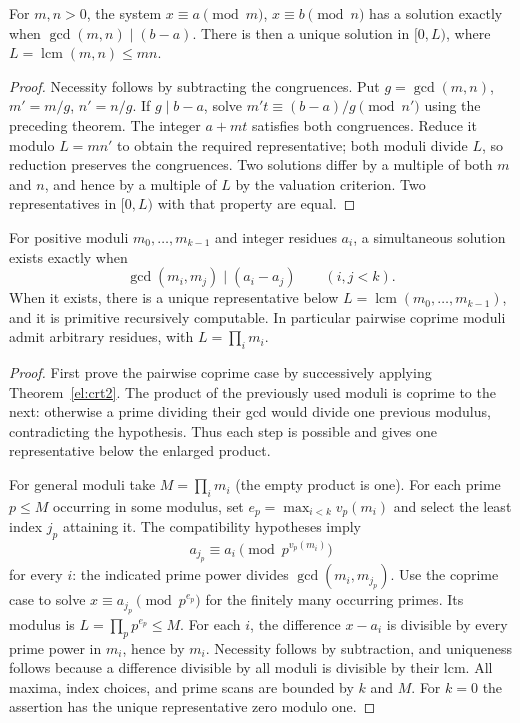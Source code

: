\begin{theorem}
\label{el:crt2}
For $m,n>0$, the system
$x\equiv a\pmod m$, $x\equiv b\pmod n$ has a solution exactly when
$\gcd(m,n)\mid(b-a)$.  There is then a unique solution in
$[0,L)$, where $L=\operatorname{lcm}(m,n)\le mn$.
\end{theorem}
\begin{proof}
Necessity follows by subtracting the congruences.  Put $g=\gcd(m,n)$,
$m'=m/g$, $n'=n/g$.  If $g\mid b-a$, solve
$m't\equiv(b-a)/g\pmod {n'}$ using the preceding theorem.  The integer
$a+mt$ satisfies both congruences.  Reduce it modulo $L=mn'$ to obtain
the required representative; both moduli divide $L$, so reduction
preserves the congruences.  Two solutions differ by a multiple of both
$m$ and $n$, and hence by a multiple of $L$ by the valuation criterion.
Two representatives in $[0,L)$ with that property are equal.
\end{proof}

\begin{theorem}
\label{el:crt}
For positive moduli $m_0,\ldots,m_{k-1}$ and integer residues $a_i$,
a simultaneous solution exists exactly when
\[
 \gcd(m_i,m_j)\mid(a_i-a_j)\qquad(i,j<k).
\]
When it exists, there is a unique representative below
$L=\operatorname{lcm}(m_0,\ldots,m_{k-1})$, and it is primitive
recursively computable.  In particular pairwise coprime moduli admit
arbitrary residues, with $L=\prod_i m_i$.
\end{theorem}
\begin{proof}
First prove the pairwise coprime case by successively applying
Theorem~\ref{el:crt2}.  The product of the previously used moduli is
coprime to the next: otherwise a prime dividing their gcd would divide
one previous modulus, contradicting the hypothesis.  Thus each step
is possible and gives one representative below the enlarged product.

For general moduli take $M=\prod_i m_i$ (the empty product is one).
For each prime $p\le M$ occurring in some modulus, set
$e_p=\max_{i<k}v_p(m_i)$ and select the least index $j_p$ attaining it.
The compatibility hypotheses imply
\[
 a_{j_p}\equiv a_i\pmod {p^{v_p(m_i)}}
\]
for every $i$: the indicated prime power divides
$\gcd(m_i,m_{j_p})$.  Use the coprime case to solve
$x\equiv a_{j_p}\pmod {p^{e_p}}$ for the finitely many occurring primes.
Its modulus is $L=\prod_p p^{e_p}\le M$.  For each $i$, the difference
$x-a_i$ is divisible by every prime power in $m_i$, hence by $m_i$.
Necessity follows by subtraction, and uniqueness follows because a
difference divisible by all moduli is divisible by their lcm.
All maxima, index choices, and prime scans are bounded by $k$ and $M$.
For $k=0$ the assertion has the unique representative zero modulo one.
\end{proof}

